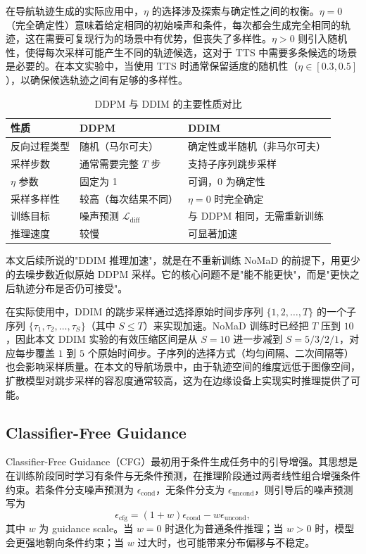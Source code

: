 在导航轨迹生成的实际应用中，$\eta$ 的选择涉及探索与确定性之间的权衡。$\eta = 0$（完全确定性）意味着给定相同的初始噪声和条件，每次都会生成完全相同的轨迹，这在需要可复现行为的场景中有优势，但丧失了多样性。$\eta > 0$ 则引入随机性，使得每次采样可能产生不同的轨迹候选，这对于 TTS 中需要多条候选的场景是必要的。在本文实验中，当使用 TTS 时通常保留适度的随机性（$\eta \in [0.3, 0.5]$），以确保候选轨迹之间有足够的多样性。

\begin{table}[htbp]
    \centering
    \caption{DDPM 与 DDIM 的主要性质对比}
    \label{tab:ddpm-ddim-compare}
    \begin{tabular}{lll}
        \toprule
        性质 & DDPM & DDIM \\
        \midrule
        反向过程类型 & 随机（马尔可夫） & 确定性或半随机（非马尔可夫） \\
        采样步数 & 通常需要完整 $T$ 步 & 支持子序列跳步采样 \\
        $\eta$ 参数 & 固定为 1 & 可调，0 为确定性 \\
        采样多样性 & 较高（每次结果不同） & $\eta=0$ 时完全确定 \\
        训练目标 & 噪声预测 $\mathcal{L}_{\text{diff}}$ & 与 DDPM 相同，无需重新训练 \\
        推理速度 & 较慢 & 可显著加速 \\
        \bottomrule
    \end{tabular}
\end{table}

本文后续所说的"DDIM 推理加速"，就是在不重新训练 NoMaD 的前提下，用更少的去噪步数近似原始 DDPM 采样。它的核心问题不是"能不能更快"，而是"更快之后轨迹分布是否仍可接受"。

在实际使用中，DDIM 的跳步采样通过选择原始时间步序列 $\{1, 2, \ldots, T\}$ 的一个子序列 $\{\tau_1, \tau_2, \ldots, \tau_S\}$（其中 $S \le T$）来实现加速。NoMaD 训练时已经把 $T$ 压到 $10$，因此本文 DDIM 实验的有效压缩区间是从 $S = 10$ 进一步减到 $S = 5/3/2/1$，对应每步覆盖 $1$ 到 $5$ 个原始时间步。子序列的选择方式（均匀间隔、二次间隔等）也会影响采样质量。在本文的导航场景中，由于轨迹空间的维度远低于图像空间，扩散模型对跳步采样的容忍度通常较高，这为在边缘设备上实现实时推理提供了可能。

\subsection{Classifier-Free Guidance}

Classifier-Free Guidance（CFG）最初用于条件生成任务中的引导增强\cite{cfg2022}。其思想是在训练阶段同时学习有条件与无条件预测，在推理阶段通过两者线性组合增强条件约束。若条件分支噪声预测为 $\epsilon_{\text{cond}}$，无条件分支为 $\epsilon_{\text{uncond}}$，则引导后的噪声预测写为
\begin{equation}
\epsilon_{\text{cfg}} = (1+w)\epsilon_{\text{cond}} - w\epsilon_{\text{uncond}},
\end{equation}
其中 $w$ 为 guidance scale。当 $w=0$ 时退化为普通条件推理；当 $w>0$ 时，模型会更强地朝向条件约束；当 $w$ 过大时，也可能带来分布偏移与不稳定。

